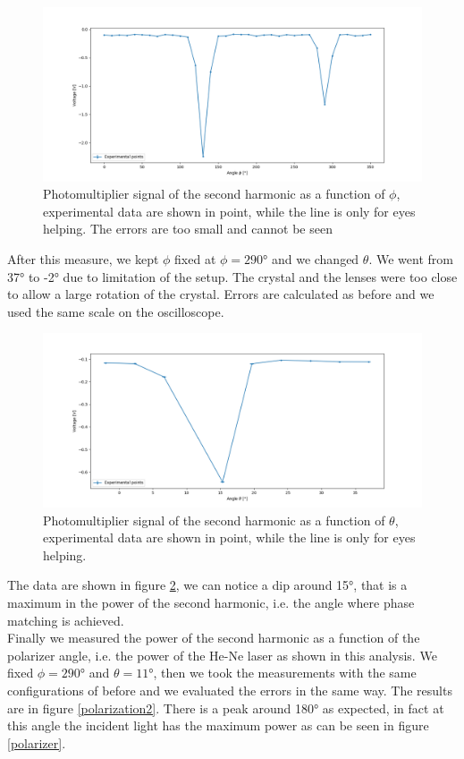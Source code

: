 \documentclass[a4paper,10pt]{article}
\begin{document}
\begin{figure}[H]
\centering
\includegraphics[width = \textwidth]{spectrum}
\caption{Photomultiplier signal of the second harmonic as a function of $\phi$, experimental data are shown in point, while the line is only for eyes helping. The errors are too small and cannot be seen}
\label{spectrum}
\end{figure}
After this measure, we kept $\phi$ fixed at $\phi=290$° and we changed $\theta$. We went from 37° to -2° due to limitation of the setup. The crystal and the lenses were too close to allow a large rotation of the crystal. Errors are calculated as before and we used the same scale on the oscilloscope.
\begin{figure}[H]
\centering
\includegraphics[width = \textwidth]{spectrum2}
\caption{Photomultiplier signal of the second harmonic as a function of $\theta$, experimental data are shown in point, while the line is only for eyes helping.}
\label{spectrum2}
\end{figure}
The data are shown in figure \ref{spectrum2}, we can notice a dip around 15°, that is a maximum in the power of the second harmonic, i.e. the angle where phase matching is achieved.\\
Finally we measured the power of the second harmonic as a function of the polarizer angle, i.e. the power of the He-Ne laser as shown in this analysis. We fixed $\phi= 290$° and $\theta = 11$°, then we took the measurements with the same configurations of before and we evaluated the errors in the same way. The results are in figure \ref{polarization2}. There is a peak around 180° as expected, in fact at this angle the incident light has the maximum power as can be seen in figure \ref{polarizer}.
\end{document}
